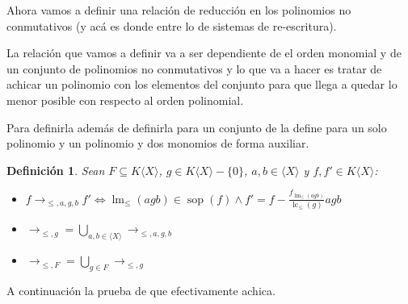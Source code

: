 \documentclass{report}
\theoremstyle{customstyle}
\newtheorem{definition}{Definición}[chapter]
\theoremstyle{factstyle}
\DeclareMathOperator{\sop}{sop}
\DeclareMathOperator{\lm}{lm}
\DeclareMathOperator{\lc}{lc}
\begin{document}
Ahora vamos a definir una relación de reducción en los polinomios no conmutativos (y acá es donde entre lo de sistemas de re-escritura).

La relación que vamos a definir va a ser dependiente de el orden monomial y de un conjunto de polinomios no conmutativos y lo que va a hacer es tratar de achicar un polinomio con los elementos del conjunto para que llega a quedar lo menor posible con respecto al orden polinomial.

Para definirla además de definirla para un conjunto de la define para un solo polinomio y un polinomio y dos monomios de forma auxiliar.

\begin{definition}
  Sean $F ⊆ K⟨X⟩$, $g ∈ K⟨X⟩ - \{0\}$, $a, b ∈ ⟨X⟩$ y $f, f' ∈ K⟨X⟩$:
  \begin{itemize}
    \item $f →_{≤, a, g, b} f' ⇔ \lm_≤(agb) ∈ \sop(f) ∧ f' = f - \frac{f_{\lm_≤(agb)}}{\lc_≤(g)}agb$
    \item $→_{≤, g} = ⋃_{a, b ∈ ⟨X⟩} →_{≤, a, g, b}$
    \item $→_{≤, F} = ⋃_{g ∈ F} →_{≤, g}$
  \end{itemize}
\end{definition}

A continuación la prueba de que efectivamente achica.
\end{document}
